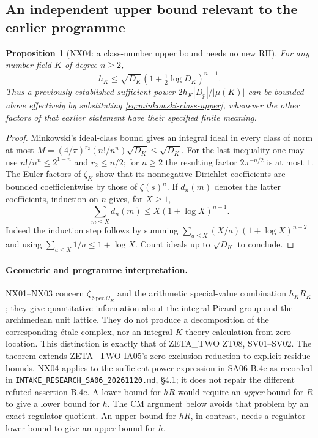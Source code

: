 \documentclass[11pt]{article}
\newtheorem{proposition}[theorem]{Proposition}
\theoremstyle{remark}
\begin{document}
\subsection{An independent upper bound relevant to the earlier programme}

\begin{proposition}[NX04: a class-number upper bound needs no new RH]
\label{NX04}
For any number field $K$ of degree $n\geq2$,
\begin{equation}\label{eq:minkowski-class-upper}
 h_K\leq\sqrt{D_K}\left(1+\tfrac12\log D_K\right)^{n-1}.
\end{equation}
Thus a previously established sufficient power
$2h_K|D_p|/|\mu(K)|$ can be bounded above effectively by substituting
\eqref{eq:minkowski-class-upper}, whenever the other factors of that
earlier statement have their specified finite meaning.
\end{proposition}

\begin{proof}
Minkowski's ideal-class bound \cite[Theorem~4.3, p.~70]{MilneANT} gives an integral ideal in every class
of norm at most
$M=(4/\pi)^{r_2}(n!/n^n)\sqrt{D_K}\leq\sqrt{D_K}$.
For the last inequality one may use $n!/n^n\leq2^{1-n}$ and
$r_2\leq n/2$; for $n\geq2$ the resulting factor
$2\pi^{-n/2}$ is at most $1$.
The Euler factors of $\zeta_K$ show that its nonnegative Dirichlet
coefficients are bounded coefficientwise by those of $\zeta(s)^n$.
If $d_n(m)$ denotes the latter coefficients, induction on $n$ gives,
for $X\geq1$,
\[
 \sum_{m\leq X}d_n(m)\leq X(1+\log X)^{n-1}.
\]
Indeed the induction step follows by summing
$\sum_{a\leq X}(X/a)(1+\log X)^{n-2}$ and using
$\sum_{a\leq X}1/a\leq1+\log X$.
Count ideals up to $\sqrt{D_K}$ to conclude.
\end{proof}

\paragraph{Geometric and programme interpretation.}
NX01--NX03 concern $\zeta_{\operatorname{Spec}\mathcal O_K}$ and the
arithmetic special-value combination $h_KR_K$; they give quantitative
information about the integral Picard group and the archimedean unit
lattice. They do not produce a decomposition of the corresponding
\'{e}tale complex, nor an integral $K$-theory calculation from zero
location. This distinction is exactly that of ZETA\_TWO ZT08, SV01--SV02.
The theorem extends ZETA\_TWO IA05's zero-exclusion reduction to explicit
residue bounds. NX04 applies to the sufficient-power expression in
SA06 B.4e as recorded in \texttt{INTAKE\_RESEARCH\_SA06\_20261120.md},
\S4.1; it does not repair the different refuted assertion B.4c.
A lower bound for $hR$ would require an \emph{upper} bound for $R$ to
give a lower bound for $h$. The CM argument below avoids that problem
by an exact regulator quotient. An upper bound for $hR$, in contrast,
needs a regulator lower bound to give an upper bound for $h$.
\end{document}
